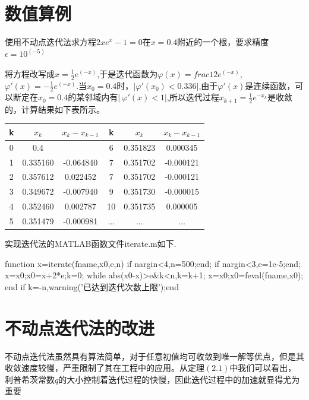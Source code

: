 \section{数值算例}
\begin{exmp}
使用不动点迭代法求方程$2xe^x-1=0$在$x=0.4$附近的一个根，要求精度$\epsilon=10^(-5)$
\end{exmp}
\begin{solution}
将方程改写成$x=\frac 1 2 e^(-x)$,于是迭代函数为$\varphi(x)=frac 1 2 e^(-x)$,$\varphi'(x)=-\frac1 2 e^(-x) $.当$x_0=0.4$时，$\lvert\varphi'(x_0)<0.336\rvert$,由于$\varphi'(x)$是连续函数，可以断定在$x_0=0.4$的某邻域内有$\lvert\ {\varphi'}(x)<1 \rvert$,所以迭代过程$x_{k+1}=\frac 1 2 e^{-x_k}$是收敛的，计算结果如下表所示。\\
\begin{table}[htbp]
\label{tab:threesome}
\centering
\begin{tabular}{|c|c|c|c|c|c|}
\hline
k & $x_k$ & ${x_k-x_{k-1}}$ & k & $x_k$ & ${x_k-x_{k-1}}$\\
\hline
0&0.4&{ }&6&0.351823&0.000345\\
1&0.335160&-0.064840&7&0.351702&-0.000121\\
2&0.357612&0.022452&7&0.351702&-0.000121\\
3&0.349672&-0.007940&9&0.351730&-0.000015\\
4&0.352460&0.002787&10&0.351735&0.000005\\
5&0.351479&-0.000981&...&...&...\\
\hline
\end{tabular} 
\end{table} 

实现迭代法的MATLAB函数文件iterate.m如下.
\begin{everbatim}
function x=iterate(fname,x0,e,n)
if nargin<4,n=500;end;
if nargin<3,e=1e-5;end;
x=x0;x0=x+2*e;k=0;
while abs(x0-x)>e&k<n,k=k+1;
  x=x0;x0=feval(fname,x0);
 end
if k=-n,warning('已达到迭代次数上限');end
\end{everbatim}
\end{solution}
\section{不动点迭代法的改进}
不动点迭代法虽然具有算法简单，对于任意初值均可收敛到唯一解等优点，但是其收敛速度较慢，严重限制了其在工程中的应用。从定理$(2.1)$中我们可以看出，利普希茨常数$q$的大小控制着迭代过程的快慢，因此迭代过程中的加速就显得尤为重要

